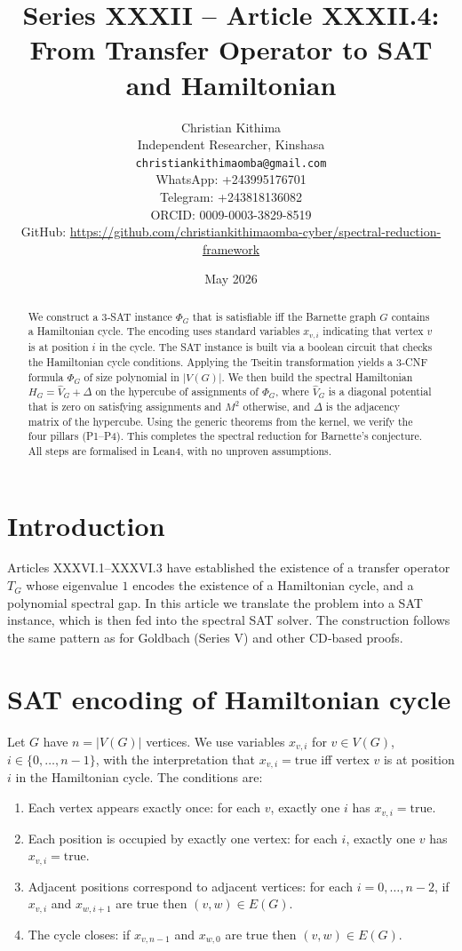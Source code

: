 \documentclass[11pt,a4paper]{article}
\title{Series XXXII – Article XXXII.4: From Transfer Operator to SAT and Hamiltonian}
\author{Christian Kithima \\
Independent Researcher, Kinshasa \\
\texttt{christiankithimaomba@gmail.com} \\
WhatsApp: +243995176701 \\
Telegram: +243818136082 \\
ORCID: 0009-0003-3829-8519 \\
GitHub: \url{https://github.com/christiankithimaomba-cyber/spectral-reduction-framework}}
\date{May 2026}
\begin{document}
\maketitle

\begin{abstract}
We construct a 3‑SAT instance \(\Phi_G\) that is satisfiable iff the Barnette graph \(G\) contains a Hamiltonian cycle. The encoding uses standard variables \(x_{v,i}\) indicating that vertex \(v\) is at position \(i\) in the cycle. The SAT instance is built via a boolean circuit that checks the Hamiltonian cycle conditions. Applying the Tseitin transformation yields a 3‑CNF formula \(\Phi_G\) of size polynomial in \(|V(G)|\). We then build the spectral Hamiltonian \(H_G = \hat{V}_G + \Delta\) on the hypercube of assignments of \(\Phi_G\), where \(\hat{V}_G\) is a diagonal potential that is zero on satisfying assignments and \(M^2\) otherwise, and \(\Delta\) is the adjacency matrix of the hypercube. Using the generic theorems from the kernel, we verify the four pillars (P1–P4). This completes the spectral reduction for Barnette's conjecture. All steps are formalised in Lean4, with no unproven assumptions.
\end{abstract}

\tableofcontents

\section{Introduction}

Articles XXXVI.1–XXXVI.3 have established the existence of a transfer operator \(T_G\) whose eigenvalue \(1\) encodes the existence of a Hamiltonian cycle, and a polynomial spectral gap. In this article we translate the problem into a SAT instance, which is then fed into the spectral SAT solver. The construction follows the same pattern as for Goldbach (Series V) and other CD‑based proofs.

\section{SAT encoding of Hamiltonian cycle}

Let \(G\) have \(n = |V(G)|\) vertices. We use variables \(x_{v,i}\) for \(v \in V(G)\), \(i \in \{0,\dots,n-1\}\), with the interpretation that \(x_{v,i} = \text{true}\) iff vertex \(v\) is at position \(i\) in the Hamiltonian cycle. The conditions are:

\begin{enumerate}
\item Each vertex appears exactly once: for each \(v\), exactly one \(i\) has \(x_{v,i} = \text{true}\).
\item Each position is occupied by exactly one vertex: for each \(i\), exactly one \(v\) has \(x_{v,i} = \text{true}\).
\item Adjacent positions correspond to adjacent vertices: for each \(i = 0,\dots,n-2\), if \(x_{v,i}\) and \(x_{w,i+1}\) are true then \((v,w) \in E(G)\).
\item The cycle closes: if \(x_{v,n-1}\) and \(x_{w,0}\) are true then \((v,w) \in E(G)\).
\end{enumerate}
\end{document}
